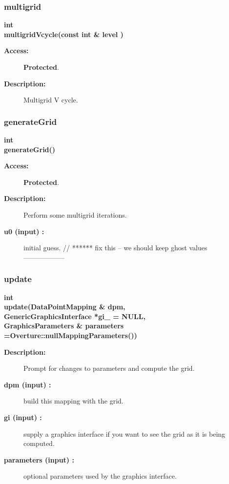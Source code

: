 \subsubsection{multigrid}
 
\begin{flushleft} \textbf{%
int  \\ 
\settowidth{\EllipticGridGeneratorIncludeArgIndent}{multigridVcycle(}%
multigridVcycle(const int \& level )
}\end{flushleft}
\begin{description}
\item[{\bf Access:}]  {\bf Protected}.
\item[{\bf Description:}] 
   Multigrid V cycle.
\end{description}
\subsubsection{generateGrid}
 
\begin{flushleft} \textbf{%
int  \\ 
\settowidth{\EllipticGridGeneratorIncludeArgIndent}{generateGrid(}%
generateGrid()
}\end{flushleft}
\begin{description}
\item[{\bf Access:}]  {\bf Protected}.
\item[{\bf Description:}] 
     Perform some multigrid iterations.

\item[{\bf u0 (input) :}]  initial guess.     // ****** fix this -- we should keep ghost values ------------------

\end{description}
\subsubsection{update}
 
\begin{flushleft} \textbf{%
int  \\ 
\settowidth{\EllipticGridGeneratorIncludeArgIndent}{update(}%
update(DataPointMapping \& dpm,\\ 
\hspace{\EllipticGridGeneratorIncludeArgIndent}GenericGraphicsInterface *gi\_  = NULL, \\ 
GraphicsParameters \& parameters  =Overture::nullMappingParameters())
}\end{flushleft}
\begin{description}
\item[{\bf Description:}] 
    Prompt for changes to parameters and compute the grid.
\item[{\bf dpm (input) :}]  build this mapping with the grid.
\item[{\bf gi (input) :}]  supply a graphics interface if you want to see the grid as it
    is being computed.
\item[{\bf parameters (input) :}]  optional parameters used by the graphics interface.

\end{description}

